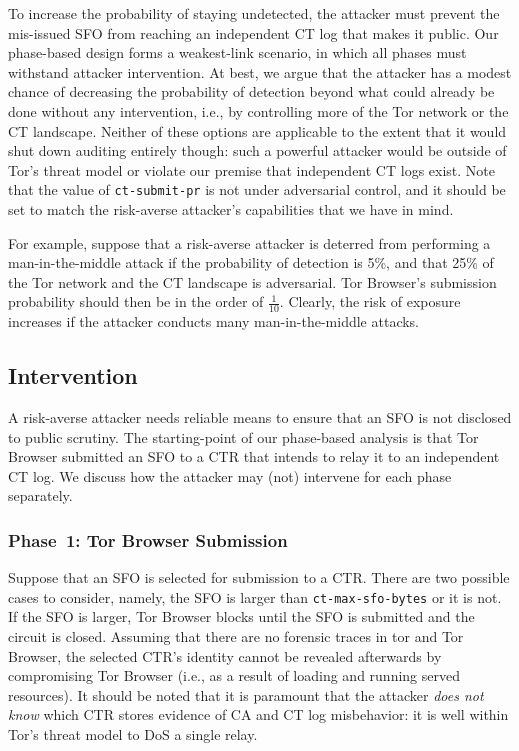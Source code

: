 To increase the probability of staying undetected, the attacker must prevent the
mis-issued SFO from reaching an independent CT log that makes it public.  Our
phase-based design forms a weakest-link scenario, in which all phases must
withstand attacker intervention.  At best, we argue that the attacker has a
modest chance of decreasing the probability of detection beyond what could
already be done without any intervention, i.e., by controlling more of the Tor
network or the CT landscape.  Neither of these options are applicable to the
extent that it would shut down auditing entirely though:
	such a powerful attacker would be outside of Tor's threat model or
	violate our premise that independent CT logs exist.
Note that the value of \texttt{ct-submit-pr} is not under adversarial control,
and it should be set to match the risk-averse attacker's capabilities that we
have in mind.

For example, suppose that a risk-averse attacker is deterred from performing a
man-in-the-middle attack if the probability of detection is 5\%, and that
25\% of the Tor network and the CT landscape is adversarial.  Tor Browser's
submission probability should then be in the order of $\frac{1}{10}$.  Clearly,
the risk of exposure increases if the attacker conducts many man-in-the-middle
attacks.

\subsection{Intervention}
A risk-averse attacker needs reliable means to ensure that an SFO is not
disclosed to public scrutiny.  The starting-point of our phase-based analysis is
that Tor Browser submitted an SFO to a CTR that intends to relay it to an
independent CT log.  We discuss how the attacker may (not) intervene for each
phase separately.

\subsubsection{Phase~1: Tor Browser Submission}
Suppose that an SFO is selected for submission to a CTR.  There are two possible
cases to consider, namely, the SFO is larger than \texttt{ct-max-sfo-bytes} or
it is not.  If the SFO is larger, Tor Browser blocks until the SFO is submitted
and the circuit is closed.  Assuming that there are no forensic traces in tor
and Tor Browser, the selected CTR's identity cannot be revealed afterwards by
compromising Tor Browser (i.e., as a result of loading and running served
resources).  It should be noted that it is paramount that the attacker
\emph{does not know} which CTR stores evidence of CA and CT log misbehavior:
	it is well within Tor's threat model to DoS a single relay.

